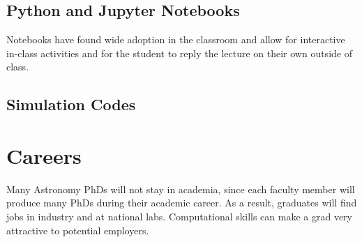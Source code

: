 \documentclass[11pt]{article}
\begin{document}
\subsection{Python and Jupyter Notebooks}

Notebooks have found wide adoption in the classroom and allow for
interactive in-class activities and for the student to reply the
lecture on their own outside of class.

\subsection{Simulation Codes}




\section{Careers}

Many Astronomy PhDs will not stay in academia, since each faculty member
will produce many PhDs during their academic career.  As a result, graduates
will find jobs in industry and at national labs.  Computational skills 
can make a grad very attractive to potential employers.
\end{document}
